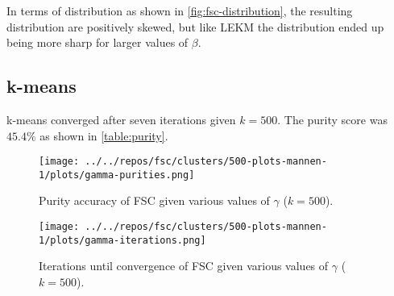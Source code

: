 \documentclass[../report.tex]{subfiles}
\begin{document}
In terms of distribution as shown in \cref{fig:fsc-distribution}, the resulting distribution are positively skewed, but like LEKM the distribution ended up being more sharp for larger values of $\beta$.

\subsection{k-means}
k-means converged after seven iterations given $k=500$. The purity score was $45.4\%$ as shown in \cref{table:purity}.

\begin{frame}

\begin{figure}
\begin{minipage}{.45\textwidth}
  \texttt{[image: ../../repos/fsc/clusters/500-plots-mannen-1/plots/gamma-purities.png]}
  \caption{Purity accuracy of FSC given various values of $\gamma$ ($k=500$).}
  \label{fig:fsc-purity}
\end{minipage}\hfill
\begin{minipage}{.45\textwidth}
  \texttt{[image: ../../repos/fsc/clusters/500-plots-mannen-1/plots/gamma-iterations.png]}
  \caption{Iterations until convergence of FSC given various values of $\gamma$ ($k=500$).}
  \label{fig:fsc-iterations}
\end{minipage}
\end{figure}
\end{frame}
\end{document}
